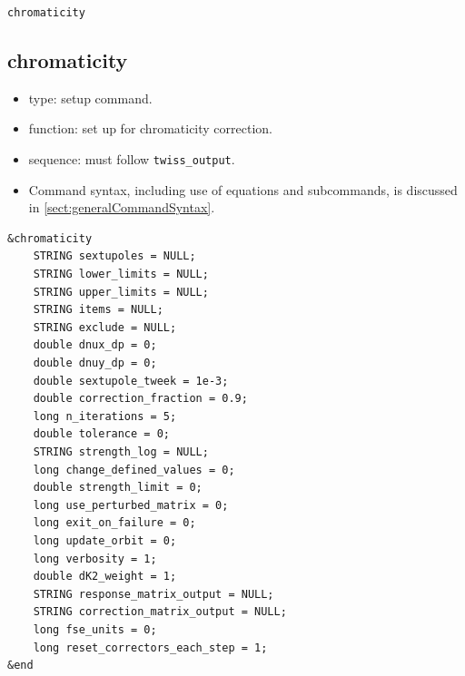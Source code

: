 \documentclass[11pt]{article}
\begin{document}
\newpage
\begin{center}{\Large\verb|chromaticity|}\end{center}
\subsection{chromaticity \label{subsec:chromaticity}}

\begin{itemize}
\item type: setup command.
\item function: set up for chromaticity correction.
\item sequence: must follow \verb|twiss_output|.
\item Command syntax, including use of equations and subcommands, is discussed in \ref{sect:generalCommandSyntax}.
\end{itemize}

\begin{verbatim}
&chromaticity
    STRING sextupoles = NULL;
    STRING lower_limits = NULL;
    STRING upper_limits = NULL;
    STRING items = NULL;
    STRING exclude = NULL;
    double dnux_dp = 0;
    double dnuy_dp = 0;
    double sextupole_tweek = 1e-3;
    double correction_fraction = 0.9;
    long n_iterations = 5;
    double tolerance = 0;
    STRING strength_log = NULL;
    long change_defined_values = 0;
    double strength_limit = 0;
    long use_perturbed_matrix = 0;    
    long exit_on_failure = 0;
    long update_orbit = 0;
    long verbosity = 1;
    double dK2_weight = 1;
    STRING response_matrix_output = NULL;
    STRING correction_matrix_output = NULL;
    long fse_units = 0;
    long reset_correctors_each_step = 1;
&end
\end{verbatim}
\end{document}
